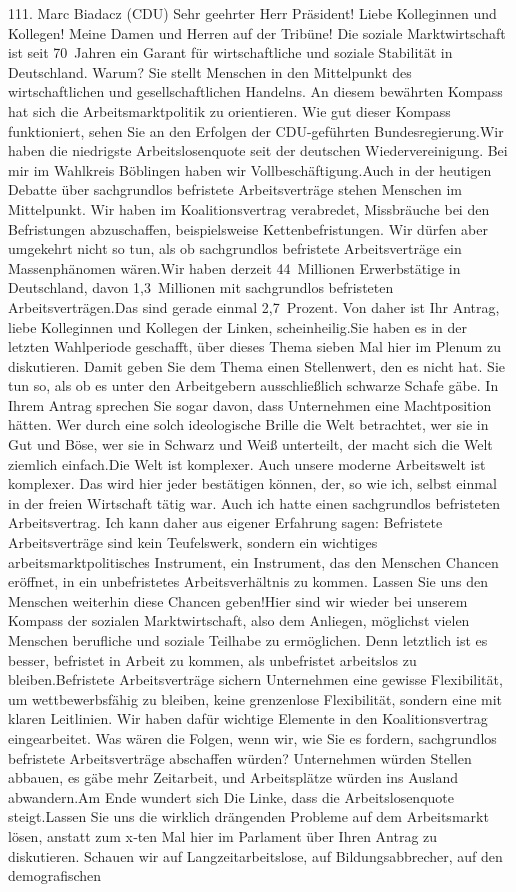 \documentclass{article}
\begin{document}
	111. Marc Biadacz (CDU) Sehr geehrter Herr Präsident! Liebe Kolleginnen und Kollegen! Meine Damen und Herren auf der Tribüne! Die soziale Marktwirtschaft ist seit 70 Jahren ein Garant für wirtschaftliche und soziale Stabilität in Deutschland. Warum? Sie stellt Menschen in den Mittelpunkt des wirtschaftlichen und gesellschaftlichen Handelns. An diesem bewährten Kompass hat sich die Arbeitsmarktpolitik zu orientieren. Wie gut dieser Kompass funktioniert, sehen Sie an den Erfolgen der CDU-geführten Bundesregierung.Wir haben die niedrigste Arbeitslosenquote seit der deutschen Wiedervereinigung. Bei mir im Wahlkreis Böblingen haben wir Vollbeschäftigung.Auch in der heutigen Debatte über sachgrundlos befristete Arbeitsverträge stehen Menschen im Mittelpunkt. Wir haben im Koalitionsvertrag verabredet, Missbräuche bei den Befristungen abzuschaffen, beispielsweise Kettenbefristungen. Wir dürfen aber umgekehrt nicht so tun, als ob sachgrundlos befristete Arbeitsverträge ein Massenphänomen wären.Wir haben derzeit 44 Millionen Erwerbstätige in Deutschland, davon 1,3 Millionen mit sachgrundlos befristeten Arbeitsverträgen.Das sind gerade einmal 2,7 Prozent. Von daher ist Ihr Antrag, liebe Kolleginnen und Kollegen der Linken, scheinheilig.Sie haben es in der letzten Wahlperiode geschafft, über dieses Thema sieben Mal hier im Plenum zu diskutieren. Damit geben Sie dem Thema einen Stellenwert, den es nicht hat. Sie tun so, als ob es unter den Arbeitgebern ausschließlich schwarze Schafe gäbe. In Ihrem Antrag sprechen Sie sogar davon, dass Unternehmen eine Machtposition hätten. Wer durch eine solch ideologische Brille die Welt betrachtet, wer sie in Gut und Böse, wer sie in Schwarz und Weiß unterteilt, der macht sich die Welt ziemlich einfach.Die Welt ist komplexer. Auch unsere moderne Arbeitswelt ist komplexer. Das wird hier jeder bestätigen können, der, so wie ich, selbst einmal in der freien Wirtschaft tätig war. Auch ich hatte einen sachgrundlos befristeten Arbeitsvertrag. Ich kann daher aus eigener Erfahrung sagen: Befristete Arbeitsverträge sind kein Teufelswerk, sondern ein wichtiges arbeitsmarktpolitisches Instrument, ein Instrument, das den Menschen Chancen eröffnet, in ein unbefristetes Arbeitsverhältnis zu kommen. Lassen Sie uns den Menschen weiterhin diese Chancen geben!Hier sind wir wieder bei unserem Kompass der sozialen Marktwirtschaft, also dem Anliegen, möglichst vielen Menschen berufliche und soziale Teilhabe zu ermöglichen. Denn letztlich ist es besser, befristet in Arbeit zu kommen, als unbefristet arbeitslos zu bleiben.Befristete Arbeitsverträge sichern Unternehmen eine gewisse Flexibilität, um wettbewerbsfähig zu bleiben, keine grenzenlose Flexibilität, sondern eine mit klaren Leitlinien. Wir haben dafür wichtige Elemente in den Koalitionsvertrag eingearbeitet. Was wären die Folgen, wenn wir, wie Sie es fordern, sachgrundlos befristete Arbeitsverträge abschaffen würden? Unternehmen würden Stellen abbauen, es gäbe mehr Zeitarbeit, und Arbeitsplätze würden ins Ausland abwandern.Am Ende wundert sich Die Linke, dass die Arbeitslosenquote steigt.Lassen Sie uns die wirklich drängenden Probleme auf dem Arbeitsmarkt lösen, anstatt zum x‑ten Mal hier im Parlament über Ihren Antrag zu diskutieren. Schauen wir auf Langzeitarbeitslose, auf Bildungsabbrecher, auf den demografischen 
\end{document}
